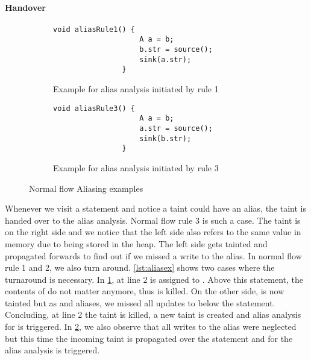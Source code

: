 \documentclass[../draft.tex]{subfiles}
\begin{document}
    \paragraph{Handover}
    \begin{figure}[ht]
        \centering
        \begin{subfigure}[b]{0.45\textwidth}
            \centering
            \begin{lstlisting}[gobble=16]
                void aliasRule1() {
                    A a = b;
                    b.str = source();
                    sink(a.str);
                }
            \end{lstlisting}
            \caption{Example for alias analysis initiated by rule 1}
            \label{lst:aliasex_a}
        \end{subfigure}
        \hfill
        \begin{subfigure}[b]{0.45\textwidth}
            \centering
            \begin{lstlisting}[gobble=16]
                void aliasRule3() {
                    A a = b;
                    a.str = source();
                    sink(b.str);
                }
            \end{lstlisting}
            \caption{Example for alias analysis initiated by rule 3}
            \label{lst:aliasex_b}
        \end{subfigure}
        \caption{Normal flow Aliasing examples}
        \label{lst:aliasex}
    \end{figure}
    Whenever we visit a statement and notice a taint could have an alias, the taint is handed over to the alias analysis. 
    Normal flow rule 3 is such a case. The taint is on the right side and we notice that the left side also refers to the same value in memory due to being stored in the heap. The left side gets tainted and propagated forwards to find out if we missed a write to the alias.
    In normal flow rule 1 and 2, we also turn around. \autoref{lst:aliasex} shows two cases where the turnaround is necessary. In \ref{lst:aliasex_a}, at line 2  is assigned to . Above this statement, the contents of  do not matter anymore, thus  is killed. On the other side,  is now tainted but as  and  aliases, we missed all updates to  below the statement. Concluding, at line 2 the  taint is killed, a new taint  is created and alias analysis for  is triggered.
    In \ref{lst:aliasex_b}, we also observe that all writes to the alias were neglected but this time the incoming taint is propagated over the statement and for  the alias analysis is triggered.
\end{document}
